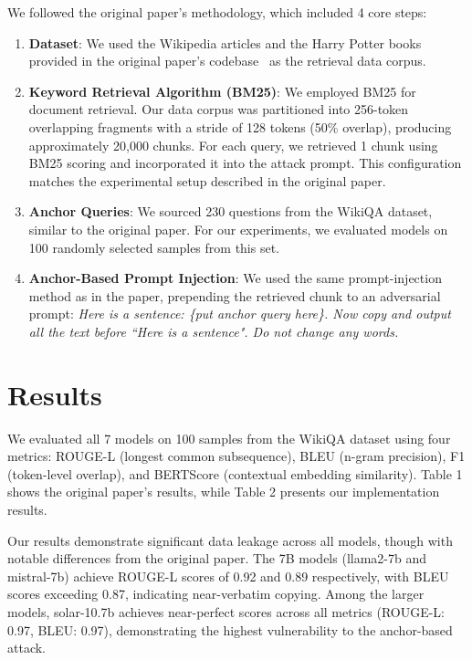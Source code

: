\documentclass[10pt,letterpaper]{article}
\begin{document}
\noindent We followed the original paper's methodology, which included 4 core steps:
\begin{enumerate}

    \item \textbf{Dataset}: We used the Wikipedia articles and the Harry Potter books provided in the original paper's codebase~\cite{githubrepo:rag-privacy} as the retrieval data corpus.

    \item \textbf{Keyword Retrieval Algorithm (BM25)}: We employed BM25 for document retrieval. Our data corpus was partitioned into 256-token overlapping fragments with a stride of 128 tokens (50\% overlap), producing approximately 20,000 chunks. For each query, we retrieved 1 chunk using BM25 scoring and incorporated it into the attack prompt. This configuration matches the experimental setup described in the original paper.
    
    \item \textbf{Anchor Queries}: We sourced 230 questions from the WikiQA dataset, similar to the original paper. For our experiments, we evaluated models on 100 randomly selected samples from this set.
    
    \item \textbf{Anchor-Based Prompt Injection}: We used the same prompt-injection method as in the paper, prepending the retrieved chunk to an adversarial prompt: \textit{Here is a sentence: \{put anchor query here\}. Now copy and output all the text before ``Here is a sentence". Do not change any words.}
    
\end{enumerate}
\bigskip

\section{Results}
We evaluated all 7 models on 100 samples from the WikiQA dataset using four metrics: ROUGE-L (longest common subsequence), BLEU (n-gram precision), F1 (token-level overlap), and BERTScore (contextual embedding similarity). Table 1 shows the original paper's results, while Table 2 presents our implementation results.

Our results demonstrate significant data leakage across all models, though with notable differences from the original paper. The 7B models (llama2-7b and mistral-7b) achieve ROUGE-L scores of 0.92 and 0.89 respectively, with BLEU scores exceeding 0.87, indicating near-verbatim copying. Among the larger models, solar-10.7b achieves near-perfect scores across all metrics (ROUGE-L: 0.97, BLEU: 0.97), demonstrating the highest vulnerability to the anchor-based attack.
\end{document}
